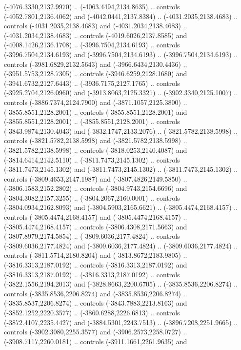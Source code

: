\begin{scope}[shift={(430.80877,-416.69739)}]
\begin{scope}[shift={(4537.8125,-1856.4436)}]
\begin{scope}[shift={(-148.39113,-28.14259)}]
        (-4076.3330,2132.9970) .. (-4063.4494,2134.8635) .. controls
        (-4052.7801,2136.4062) and (-4042.0441,2137.8384) .. (-4031.2035,2138.4683) ..
        controls (-4031.2035,2138.4683) and (-4031.2034,2138.4683) ..
        (-4031.2034,2138.4683) .. controls (-4019.6026,2137.8585) and
        (-4008.1426,2136.1708) .. (-3996.7504,2134.6193) .. controls
        (-3996.7504,2134.6193) and (-3996.7504,2134.6193) .. (-3996.7504,2134.6193) ..
        controls (-3981.6829,2132.5643) and (-3966.6434,2130.4436) ..
        (-3951.5753,2128.7305) .. controls (-3946.6259,2128.1680) and
        (-3941.6732,2127.6443) .. (-3936.7175,2127.1765) .. controls
        (-3925.2704,2126.0960) and (-3913.8063,2125.3321) .. (-3902.3340,2125.1007) ..
        controls (-3886.7374,2124.7900) and (-3871.1057,2125.3800) ..
        (-3855.8551,2128.2001) .. controls (-3855.8551,2128.2001) and
        (-3855.8551,2128.2001) .. (-3855.8551,2128.2001) .. controls
        (-3843.9874,2130.4043) and (-3832.1747,2133.2076) .. (-3821.5782,2138.5998) ..
        controls (-3821.5782,2138.5998) and (-3821.5782,2138.5998) ..
        (-3821.5782,2138.5998) .. controls (-3818.0253,2140.4087) and
        (-3814.6414,2142.5110) .. (-3811.7473,2145.1302) .. controls
        (-3811.7473,2145.1302) and (-3811.7473,2145.1302) .. (-3811.7473,2145.1302) ..
        controls (-3809.4653,2147.1987) and (-3807.4826,2149.5850) ..
        (-3806.1583,2152.2802) .. controls (-3804.9743,2154.6696) and
        (-3804.3082,2157.3255) .. (-3804.2067,2160.0001) .. controls
        (-3804.0934,2162.8093) and (-3804.5903,2165.6621) .. (-3805.4474,2168.4157) ..
        controls (-3805.4474,2168.4157) and (-3805.4474,2168.4157) ..
        (-3805.4474,2168.4157) .. controls (-3806.4308,2171.5663) and
        (-3807.8979,2174.5854) .. (-3809.6036,2177.4824) .. controls
        (-3809.6036,2177.4824) and (-3809.6036,2177.4824) .. (-3809.6036,2177.4824) ..
        controls (-3811.5714,2180.8204) and (-3813.8672,2183.9805) ..
        (-3816.3313,2187.0192) .. controls (-3816.3313,2187.0192) and
        (-3816.3313,2187.0192) .. (-3816.3313,2187.0192) .. controls
        (-3822.1556,2194.2013) and (-3828.8663,2200.6705) .. (-3835.8536,2206.8274) ..
        controls (-3835.8536,2206.8274) and (-3835.8536,2206.8274) ..
        (-3835.8537,2206.8274) .. controls (-3843.7883,2213.8163) and
        (-3852.1252,2220.3577) .. (-3860.6288,2226.6813) .. controls
        (-3872.4107,2235.4427) and (-3884.5301,2243.7513) .. (-3896.7208,2251.9665) ..
        controls (-3902.3080,2255.3577) and (-3906.2573,2258.0727) ..
        (-3908.7117,2260.0181) .. controls (-3911.1661,2261.9635) and

\end{scope}
\end{scope}
\end{scope}
